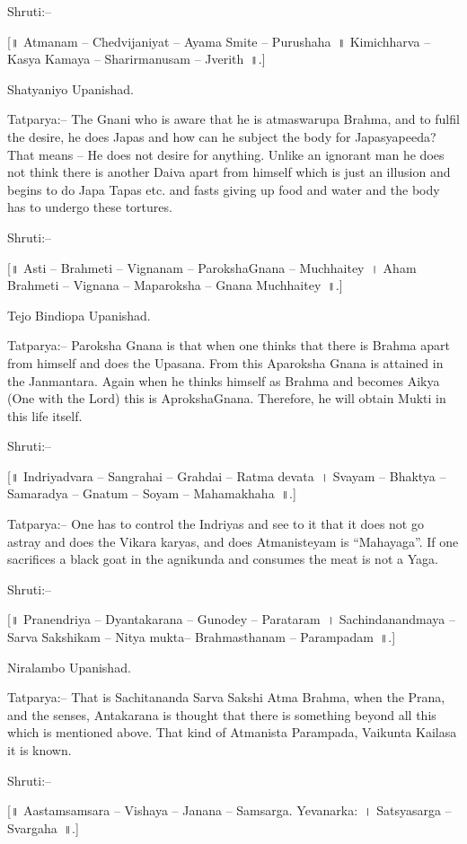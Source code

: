 Shruti:–

[॥ Atmanam – Chedvijaniyat – Ayama Smite – Purushaha~॥ Kimichharva – Kasya Kamaya – Sharirmanusam – Jverith~॥.]

Shatyaniyo Upanishad.

Tatparya:– The Gnani who is aware that he is atmaswarupa Brahma, and to fulfil the desire, he does Japas and how can he subject the body for Japasyapeeda? That means – He does not desire for anything. Unlike an ignorant man he does not think there is another Daiva apart from himself which is just an illusion and begins to do Japa Tapas etc. and fasts giving up food and water and the body has to undergo these tortures.

Shruti:–

[॥ Asti – Brahmeti – Vignanam – ParokshaGnana – Muchhaitey~। Aham Brahmeti – Vignana – Maparoksha – Gnana Muchhaitey~॥.]

Tejo Bindiopa Upanishad.

Tatparya:– Paroksha Gnana is that when one thinks that there is Brahma apart from himself and does the Upasana. From this Aparoksha Gnana is attained in the Janmantara. Again when he thinks himself as Brahma and becomes Aikya (One with the Lord) this is AprokshaGnana. Therefore, he will obtain Mukti in this life itself.

Shruti:–

[॥ Indriyadvara – Sangrahai – Grahdai – Ratma devata~। Svayam – Bhaktya – Samaradya – Gnatum – Soyam – Mahamakhaha~॥.]

Tatparya:– One has to control the Indriyas and see to it that it does not go astray and does the Vikara karyas, and does Atmanisteyam is “Mahayaga”. If one sacrifices a black goat in the agnikunda and consumes the meat is not a Yaga.

Shruti:–

[॥ Pranendriya – Dyantakarana – Gunodey – Parataram~। Sachindanandmaya – Sarva Sakshikam – Nitya mukta– Brahmasthanam – Parampadam~॥.]

Niralambo Upanishad.

Tatparya:– That is Sachitananda Sarva Sakshi Atma Brahma, when the Prana, and the senses, Antakarana is thought that there is something beyond all this which is mentioned above. That kind of Atmanista Parampada, Vaikunta Kailasa it is known.

Shruti:–

[॥ Aastamsamsara – Vishaya – Janana – Samsarga. Yevanarka:~। Satsyasarga – Svargaha~॥.]


